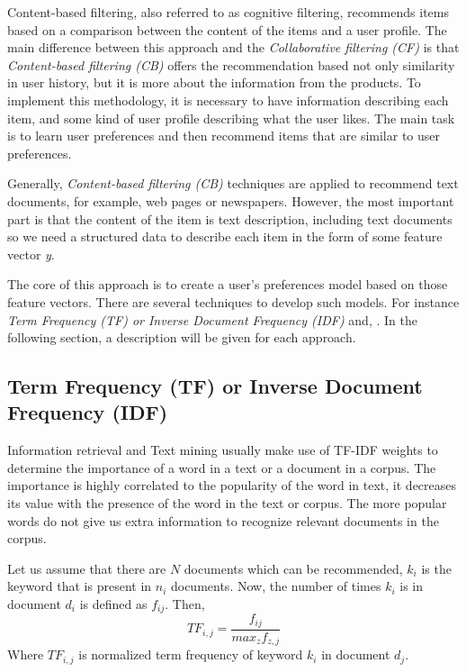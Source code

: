 \documentclass[conference]{IEEEtran}
\begin{document}
Content-based filtering, also referred to as cognitive filtering, recommends items based on a comparison between the content of the items and a user profile. The main difference between this approach and
the \textit{Collaborative filtering (CF)} is that \textit{Content-based filtering (CB)} offers the recommendation based not only similarity in user history, but it is more about the information from the products. To implement this methodology, it is necessary to have information describing each item, and some kind of user profile describing what the user likes. The main task is to learn user preferences and then recommend items that are similar to user preferences.

Generally, \textit{Content-based filtering (CB)} techniques are applied to recommend text documents, for example, web pages or newspapers. However, the most important part is that the content of the item is text description, including text documents so we need a structured data to describe each item in the form of some feature vector \textit{y}.

The core of this approach is to create a user's preferences model based on those feature vectors. There are several techniques to develop such models. For instance \textit{Term Frequency (TF) or Inverse Document Frequency (IDF)} and, . In the following section, a description will be given for each approach.

\subsection{Term Frequency (TF) or Inverse Document Frequency (IDF)}\label{AA}

Information retrieval and Text mining usually make use of TF-IDF weights to determine the importance of a word in a text or a document in a corpus. The importance is highly correlated to the popularity of the word in text, it decreases its value with the presence of the word in the text or corpus. The more popular words do not give us extra information to recognize relevant documents in the corpus.

Let us assume that there are \(N\) documents which can be recommended, \(k_{i}\) is the keyword that is present in \(n_{i}\) documents. Now, the number of times \(k_{i}\) is in document \(d_{i}\) is defined as \(f_{ij}\). Then,
\begin{equation}
    TF_{i,j} = \frac{f_{ij}}{max_{z}f_{z,j}}
\end{equation}
Where \(TF_{i,j}\) is normalized term frequency of keyword \(k_{i}\) in document \(d_{j}\). 
\end{document}
